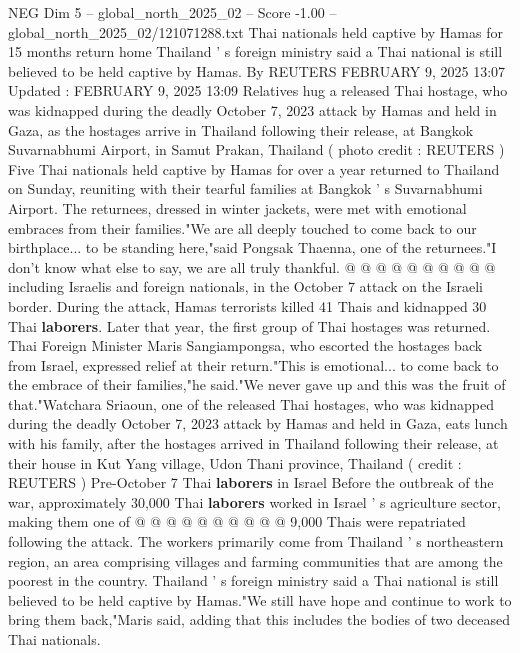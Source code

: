 \begin{textsample}{NEG Dim 5 – global\_north\_2025\_02 – Score -1.00 – global\_north\_2025\_02/121071288.txt}  \label{ex:f5_neg_247}
Thai nationals held captive by Hamas for 15 months return home Thailand ' s foreign ministry said a Thai national is still believed to be held captive by Hamas.
By REUTERS FEBRUARY 9, 2025 13:07 Updated : FEBRUARY 9, 2025 13:09 Relatives hug a released Thai hostage, who was kidnapped during the deadly October 7, 2023 attack by Hamas and held in Gaza, as the hostages arrive in Thailand following their release, at Bangkok Suvarnabhumi Airport, in Samut Prakan, Thailand ( photo credit : REUTERS ) Five Thai nationals held captive by Hamas for over a year returned to Thailand on Sunday, reuniting with their tearful families at Bangkok ' s Suvarnabhumi Airport.
The returnees, dressed in winter jackets, were met with emotional embraces from their families."We are all deeply touched to come back to our birthplace... to be standing here,"said Pongsak Thaenna, one of the returnees."I don't know what else to say, we are all truly thankful. @ @ @ @ @ @ @ @ @ @ including Israelis and foreign nationals, in the October 7 attack on the Israeli border.
During the attack, Hamas terrorists killed 41 Thais and kidnapped 30 Thai \textbf{laborers}.
Later that year, the first group of Thai hostages was returned.
Thai Foreign Minister Maris Sangiampongsa, who escorted the hostages back from Israel, expressed relief at their return."This is emotional... to come back to the embrace of their families,"he said."We never gave up and this was the fruit of that."Watchara Sriaoun, one of the released Thai hostages, who was kidnapped during the deadly October 7, 2023 attack by Hamas and held in Gaza, eats lunch with his family, after the hostages arrived in Thailand following their release, at their house in Kut Yang village, Udon Thani province, Thailand ( credit : REUTERS ) Pre-October 7 Thai \textbf{laborers} in Israel Before the outbreak of the war, approximately 30,000 Thai \textbf{laborers} worked in Israel ' s agriculture sector, making them one of @ @ @ @ @ @ @ @ @ @ 9,000 Thais were repatriated following the attack.
The workers primarily come from Thailand ' s northeastern region, an area comprising villages and farming communities that are among the poorest in the country.
Thailand ' s foreign ministry said a Thai national is still believed to be held captive by Hamas."We still have hope and continue to work to bring them back,"Maris said, adding that this includes the bodies of two deceased Thai nationals.

\end{textsample}

